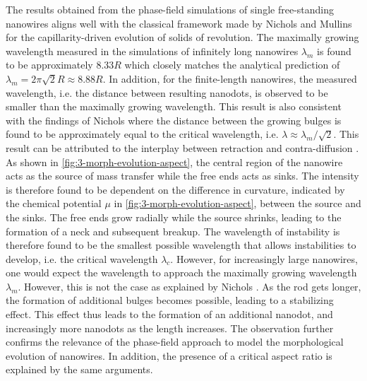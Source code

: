 The results obtained from the phase-field simulations of single free-standing nanowires aligns well with the classical framework made by Nichols and Mullins \cite{NicholsMullins1965,Nichols1976} for the capillarity-driven evolution of solids of revolution. The maximally growing wavelength measured in the simulations of infinitely long nanowires $\lambda_m$ is found to be approximately $8.33 R$ which closely matches the analytical prediction of $\lambda_m=2\pi\sqrt{2}R\approx 8.88 R$. In addition, for the finite-length nanowires, the measured wavelength, i.e. the distance between resulting nanodots, is observed to be smaller than the maximally growing wavelength. This result is also consistent with the findings of Nichols \cite{Nichols1976} where the distance between the growing bulges is found to be approximately equal to the critical wavelength, i.e. $\lambda \approx \lambda_m/\sqrt{2}$. This result can be attributed to the interplay between retraction and contra-diffusion \cite{Nichols1976,AmosMushongeraMittnachtNestler2018}. As shown in \autoref{fig:3-morph-evolution-aspect}, the central region of the nanowire acts as the source of mass transfer while the free ends acts as sinks. The intensity is therefore found to be dependent on the difference in curvature, indicated by the chemical potential $\mu$ in \autoref{fig:3-morph-evolution-aspect}, between the source and the sinks. The free ends grow radially while the source shrinks, leading to the formation of a neck and subsequent breakup. The wavelength of instability is therefore found to be the smallest possible wavelength that allows instabilities to develop, i.e. the critical wavelength $\lambda_c$. However, for increasingly large nanowires, one would expect the wavelength to approach the maximally growing wavelength $\lambda_m$. However, this is not the case as explained by Nichols \cite{Nichols1976}. As the rod gets longer, the formation of additional bulges becomes possible, leading to a stabilizing effect. This effect thus leads to the formation of an additional nanodot, and increasingly more nanodots as the length increases. The observation further confirms the relevance of the phase-field approach to model the morphological evolution of nanowires. In addition, the presence of a critical aspect ratio is explained by the same arguments.


